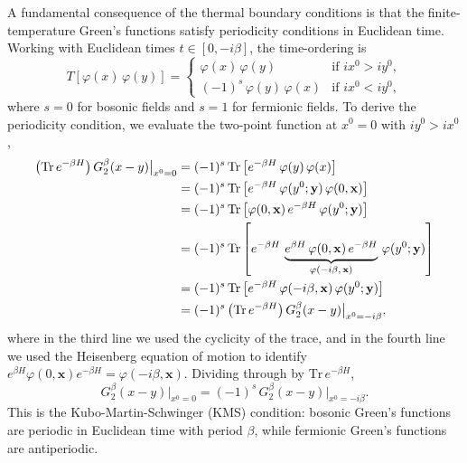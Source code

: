 A fundamental consequence of the thermal boundary conditions is that the
finite-temperature Green's functions satisfy periodicity conditions in
Euclidean time. Working with Euclidean times $t\in[0,-i\beta]$, the
time-ordering is
\begin{equation}
	T\left[\varphi(x)\,\varphi(y)\right] =
	\begin{cases}
		\varphi(x)\,\varphi(y)         & \text{if } ix^0 > iy^0, \\
		(-1)^s\,\varphi(y)\,\varphi(x) & \text{if } ix^0 < iy^0,
	\end{cases}
\end{equation}
where $s=0$ for bosonic fields and $s=1$ for fermionic fields. To derive
the periodicity condition, we evaluate the two-point function at $x^0=0$
with $iy^0 > ix^0$,
\begin{align}
	\left(\mathrm{Tr}\,e^{-\beta H}\right)
	G_2^\beta(x-y)\big|_{x^0=0}
	 & = (-1)^s\,\mathrm{Tr}\left[e^{-\beta H}\,
		                        \varphi(y)\,\varphi(x)\right] \notag                               \\
	 & = (-1)^s\,\mathrm{Tr}\left[e^{-\beta H}\,
		                        \varphi(y^0;\mathbf{y})\,\varphi(0,\mathbf{x})\right] \notag       \\
	 & = (-1)^s\,\mathrm{Tr}\left[\varphi(0,\mathbf{x})\,
		                        e^{-\beta H}\,\varphi(y^0;\mathbf{y})\right] \notag                \\
	 & = (-1)^s\,\mathrm{Tr}\left[e^{-\beta H}\,
		                        \underbrace{e^{\beta H}\,\varphi(0,\mathbf{x})\,
			                        e^{-\beta H}}_{\varphi(-i\beta,\,\mathbf{x})}\,
		                        \varphi(y^0;\mathbf{y})\right] \notag                    \\
	 & = (-1)^s\,\mathrm{Tr}\left[e^{-\beta H}\,
		                        \varphi(-i\beta,\mathbf{x})\,\varphi(y^0;\mathbf{y})\right] \notag \\
	 & = (-1)^s\left(\mathrm{Tr}\,e^{-\beta H}\right)
	G_2^\beta(x-y)\big|_{x^0=-i\beta},
\end{align}
where in the third line we used the cyclicity of the trace, and in the
fourth line we used the Heisenberg equation of motion to identify
$e^{\beta H}\varphi(0,\mathbf{x})e^{-\beta H} = \varphi(-i\beta,\mathbf{x})$.
Dividing through by $\mathrm{Tr}\,e^{-\beta H}$,
\begin{equation}
	\boxed{G_2^\beta(x-y)\big|_{x^0=0}
		= (-1)^s\,G_2^\beta(x-y)\big|_{x^0=-i\beta}.}
\end{equation}
This is the Kubo-Martin-Schwinger (KMS) condition: bosonic Green's
functions are periodic in Euclidean time with period $\beta$, while
fermionic Green's functions are antiperiodic.

